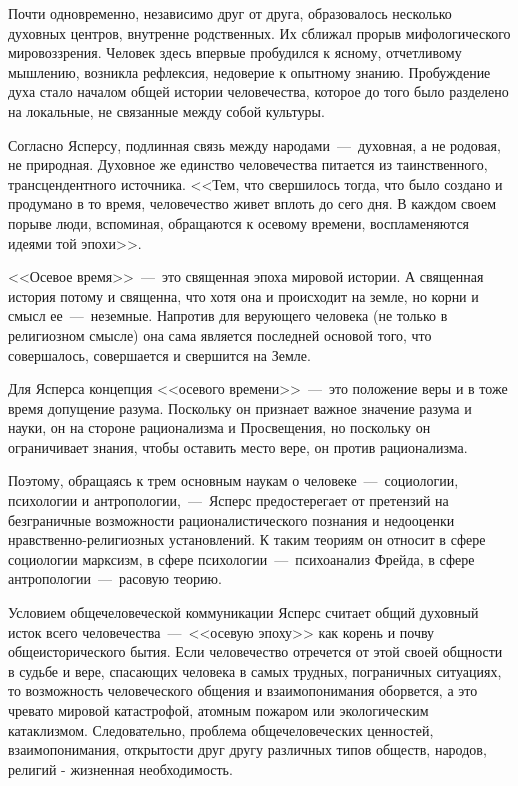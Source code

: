 \documentclass{bmstu}
\begin{document}
Почти одновременно, независимо друг от друга, образовалось несколько духовных центров, внутренне родственных. Их сближал прорыв мифологического мировоззрения. Человек здесь впервые пробудился к ясному, отчетливому мышлению, возникла рефлексия, недоверие к опытному знанию. Пробуждение духа стало началом общей истории человечества, которое до того было разделено на локальные, не связанные между собой культуры.

Согласно Ясперсу, подлинная связь между народами~---~духовная, а не родовая, не природная. Духовное же единство человечества питается из таинственного, трансцендентного источника. <<Тем, что свершилось тогда, что было создано и продумано в то время, человечество живет вплоть до сего дня. В каждом своем порыве люди, вспоминая, обращаются к осевому времени, воспламеняются идеями той эпохи>>.

<<Осевое время>>~---~это священная эпоха мировой истории. А священная история потому и священна, что хотя она и происходит на земле, но корни и смысл ее~---~неземные. Напротив для верующего человека (не только в религиозном смысле) она сама является последней основой того, что совершалось, совершается и свершится на Земле.

Для Ясперса концепция <<осевого времени>>~---~это положение веры и в тоже время допущение разума. Поскольку он признает важное значение разума и науки, он на стороне рационализма и Просвещения, но поскольку он ограничивает знания, чтобы оставить место вере, он против рационализма.

Поэтому, обращаясь к трем основным наукам о человеке~---~социологии, психологии и антропологии,~---~Ясперс предостерегает от претензий на безграничные возможности рационалистического познания и недооценки нравственно-религиозных установлений. К таким теориям он относит в сфере социологии марксизм, в сфере психологии~---~психоанализ Фрейда, в сфере антропологии~---~расовую теорию.

Условием общечеловеческой коммуникации Ясперс считает общий духовный исток всего человечества~---~<<осевую эпоху>> как корень и почву общеисторического бытия. Если человечество отречется от этой своей общности в судьбе и вере, спасающих человека в самых трудных, пограничных ситуациях, то возможность человеческого общения и взаимопонимания оборвется, а это чревато мировой катастрофой, атомным пожаром или экологическим катаклизмом. Следовательно, проблема общечеловеческих ценностей, взаимопонимания, открытости друг другу различных типов обществ, народов, религий - жизненная необходимость.
\end{document}
